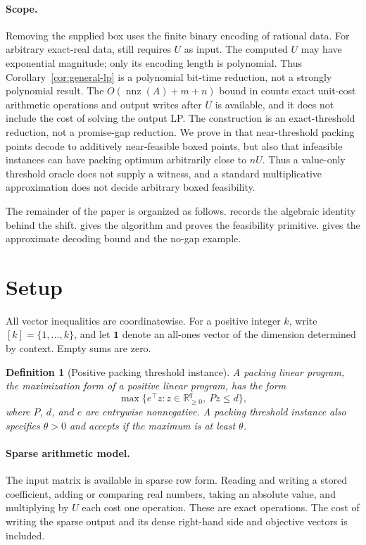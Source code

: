 \documentclass[11pt]{article}
\newtheorem{definition}[theorem]{Definition}
\theoremstyle{remark}
\newcommand{\R}{\mathbb{R}}
\newcommand{\one}{\bm{1}}
\newcommand{\nnz}{\operatorname{nnz}}
\begin{document}
\paragraph{Scope.}
Removing the supplied box uses the finite binary encoding of rational
data.  For arbitrary exact-real data,  still requires
$U$ as input.  The computed $U$ may have exponential magnitude; only
its encoding length is polynomial.  Thus Corollary~\ref{cor:general-lp} is a
polynomial bit-time reduction, not a strongly polynomial result.  The
$O(\nnz(A)+m+n)$ bound in  counts exact unit-cost
arithmetic operations and output writes after $U$ is available, and it
does not include the cost of solving the output LP.  The construction
is an exact-threshold reduction, not a promise-gap reduction.  We prove in
 that near-threshold packing points
decode to additively near-feasible boxed points, but also that
infeasible instances can have packing optimum arbitrarily close to
$nU$.  Thus a value-only threshold oracle does not supply a witness,
and a standard multiplicative approximation does not decide arbitrary
boxed feasibility.

The remainder of the paper is organized as follows.
 records the algebraic identity behind the shift.
 gives the algorithm and proves the feasibility
primitive.   gives the
approximate decoding bound and the no-gap example.

\section{Setup}
\label{sec:setup}

All vector inequalities are coordinatewise.  For a positive integer
$k$, write $[k]=\{1,\ldots,k\}$, and let $\one$ denote an all-ones
vector of the dimension determined by context.  Empty sums are zero.

\begin{definition}[Positive packing threshold instance]
\label{def:packing-threshold}
A packing linear program, the maximization form of a positive linear
program, has the form
\[
  \max\{e^\top z:z\in\R_{\geq0}^{q},\ Pz\leq d\},
\]
where $P$, $d$, and $e$ are entrywise nonnegative.  A packing
threshold instance also specifies $\theta>0$ and accepts if the
maximum is at least $\theta$.
\end{definition}

\paragraph{Sparse arithmetic model.}
The input matrix is available in sparse row form.  Reading and writing
a stored coefficient, adding or comparing real numbers, taking an
absolute value, and multiplying by $U$ each cost one operation.  These
are exact operations.  The cost of writing the sparse output and its
dense right-hand side and objective vectors is included.
\end{document}

